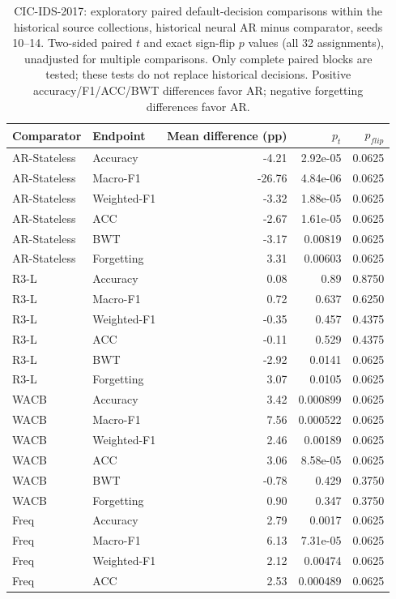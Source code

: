 \begin{table}[t]\centering\scriptsize
\caption{CIC-IDS-2017: exploratory paired default-decision comparisons within the historical source collections, historical neural AR minus comparator, seeds 10--14. Two-sided paired $t$ and exact sign-flip $p$ values (all 32 assignments), unadjusted for multiple comparisons. Only complete paired blocks are tested; these tests do not replace historical decisions. Positive accuracy/F1/ACC/BWT differences favor AR; negative forgetting differences favor AR.}
\begin{tabular}{llrrr}\toprule Comparator & Endpoint & Mean difference (pp) & $p_t$ & $p_{flip}$ \\\midrule
AR-Stateless & Accuracy & -4.21 & 2.92e-05 & 0.0625 \\
AR-Stateless & Macro-F1 & -26.76 & 4.84e-06 & 0.0625 \\
AR-Stateless & Weighted-F1 & -3.32 & 1.88e-05 & 0.0625 \\
AR-Stateless & ACC & -2.67 & 1.61e-05 & 0.0625 \\
AR-Stateless & BWT & -3.17 & 0.00819 & 0.0625 \\
AR-Stateless & Forgetting & 3.31 & 0.00603 & 0.0625 \\
R3-L & Accuracy & 0.08 & 0.89 & 0.8750 \\
R3-L & Macro-F1 & 0.72 & 0.637 & 0.6250 \\
R3-L & Weighted-F1 & -0.35 & 0.457 & 0.4375 \\
R3-L & ACC & -0.11 & 0.529 & 0.4375 \\
R3-L & BWT & -2.92 & 0.0141 & 0.0625 \\
R3-L & Forgetting & 3.07 & 0.0105 & 0.0625 \\
WACB & Accuracy & 3.42 & 0.000899 & 0.0625 \\
WACB & Macro-F1 & 7.56 & 0.000522 & 0.0625 \\
WACB & Weighted-F1 & 2.46 & 0.00189 & 0.0625 \\
WACB & ACC & 3.06 & 8.58e-05 & 0.0625 \\
WACB & BWT & -0.78 & 0.429 & 0.3750 \\
WACB & Forgetting & 0.90 & 0.347 & 0.3750 \\
Freq & Accuracy & 2.79 & 0.0017 & 0.0625 \\
Freq & Macro-F1 & 6.13 & 7.31e-05 & 0.0625 \\
Freq & Weighted-F1 & 2.12 & 0.00474 & 0.0625 \\
Freq & ACC & 2.53 & 0.000489 & 0.0625 \\

\end{tabular}
\end{table}
